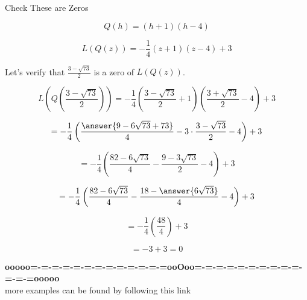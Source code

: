 \documentclass{ximera}
\begin{document}
\begin{claim} Check These are Zeros


\[   Q(h) = (h+1)(h-4)   \]


\[   L(Q(z)) = -\frac{1}{4} (z+1)(z-4) + 3   \]


Let's verify that $\frac{3 - \sqrt{73}}{2}$ is a zero of $L(Q(z))$.



\[   L \left( Q \left( \frac{3 - \sqrt{73}}{2} \right) \right) = -\frac{1}{4} \left( \frac{3 - \sqrt{73}}{2}+1 \right) \left( \frac{3 + \sqrt{73}}{2}-4 \right) + 3    \]



\[  = -\frac{1}{4} \left( \frac{\answer{9 - 6 \sqrt{73} + 73}}{4} - 3 \cdot \frac{3 - \sqrt{73}}{2} - 4 \right) + 3    \]


\[  = -\frac{1}{4} \left( \frac{82 - 6 \sqrt{73}}{4} - \frac{9 - 3 \sqrt{73}}{2} - 4 \right) + 3    \]


\[  = -\frac{1}{4} \left( \frac{82 - 6 \sqrt{73}}{4} - \frac{18 - \answer{6 \sqrt{73}}}{4} - 4 \right) + 3    \]


\[  = -\frac{1}{4} \left( \frac{48}{4} \right) + 3    \]


\[  = -3 + 3   = 0 \]


\end{claim}















\begin{center}
\textbf{\textcolor{green!50!black}{ooooo=-=-=-=-=-=-=-=-=-=-=-=-=ooOoo=-=-=-=-=-=-=-=-=-=-=-=-=ooooo}} \\

more examples can be found by following this link\\ 

\end{center}
\end{document}
